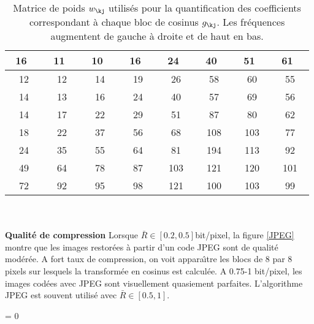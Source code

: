 \begin{table}
\footnotesize
\begin{center}
\begin{tabular}{| c | c | c | c | c | c | c | c |} \hline
\ 16\ \  &\ 11\ \ &\ 10\ \ &\ 16\ \ &\ 24\ \ &\ 40\ \ &\ 51\ \ &\ 61\
\ \\ \hline
 12 &  12 & 14 &  19 & 26 & 58&  60&  55\\ \hline
 14 & 13&  16&  24 & 40&  57&  69&  56  \\ \hline
 14 & 17 & 22&  29 &  51 & 87&  80 & 62\\ \hline
 18 & 22 & 37 & 56 & 68 & 108 & 103&  77\\ \hline
 24&  35 & 55&  64 & 81 & 194 & 113 & 92\\ \hline
 49 & 64 & 78&  87 & 103&  121&  120 & 101\\ \hline
 72&  92&  95 & 98 & 121&  100 & 103 & 99\\ \hline
\end{tabular}
\end{center}
\normalsize
\caption{Matrice de poids $w_\kj$ utilis\'es pour la
quantification des coefficients 
correspondant \`a chaque bloc de cosinus
$g_\kj$. Les fr\'equences augmentent de gauche \`a droite et
de haut en bas.}
\label{TableOfWeights}
\end{table}
\\
\\
{\bf Qualit\'e de compression}
Lorsque $\bar R \in [0.2,0.5]$bit/pixel, la figure \ref{JPEG} montre que
les images restor\'ees \`a partir d'un code JPEG sont de qualit\'e
mod\'er\'ee.
A fort taux de compression, on voit appara\^{\i}tre les blocs
de 8 par 8 pixels sur lesquels la transform\'ee en cosinus est
calcul\'ee.
A 0.75-1 bit/pixel, les images cod\'ees avec JPEG sont
visuellement quasiement parfaites. L'algorithme JPEG est
souvent utilis\'e avec $\bar R \in [0.5,1]$.



\vspace{5cm}\setlength{\tabcolsep}{0cm} %
\setlength{\fboxsep}{0cm} %
\avecboite = 0

